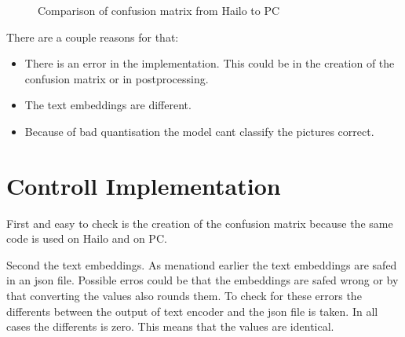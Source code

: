\begin{figure}[!h]
    \centering
    \label{methods:fig:compareConfM}
    \caption{Comparison of confusion matrix from Hailo to PC}
\end{figure}

There are a couple reasons for that:
\begin{itemize}
    \item There is an error in the implementation. This could be in the creation of the confusion matrix or in postprocessing.
    \item The text embeddings are different.
    \item Because of bad quantisation the model cant classify the pictures correct.
\end{itemize}

\section{Controll Implementation
    \label{scetion:methods:contimp}}
First and easy to check is the creation of the confusion matrix because the same code is used on Hailo and on PC.

Second the text embeddings.
As menationd earlier the text embeddings are safed in an json file.
Possible erros could be that the embeddings are safed wrong or by that converting the values also rounds them.
To check for these errors the differents between the output of text encoder and the json file is taken.
In all cases the differents is zero.
This means that the values are identical.

